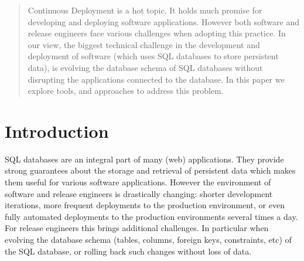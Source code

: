 \documentclass[conference]{IEEEtran}
\begin{document}
\maketitle


\begin{abstract}

Continuous Deployment is a hot topic. It holds much promise for developing and deploying software applications. However both software and release engineers face various challenges when adopting this practice. In our view, the biggest technical challenge in the development and deployment of software (which uses SQL databases to store persistent data), is evolving the database schema of SQL databases without disrupting the applications connected to the database. In this paper we explore tools, and approaches to address this problem.

\end{abstract}





%
\IEEEpeerreviewmaketitle



\section{Introduction} %


SQL databases are an integral part of many (web) applications. They provide strong guarantees about the storage and retrieval of persistent data which makes them useful for various software applications. However the environment of software and release engineers is drastically changing: shorter development iterations, more frequent deployments to the production environment, or even fully automated deployments to the production environments several times a day. For release engineers this brings additional challenges. In particular when evolving the database schema (tables, columns, foreign keys, constraints, etc) of the SQL database, or rolling back such changes without loss of data.
\end{document}
